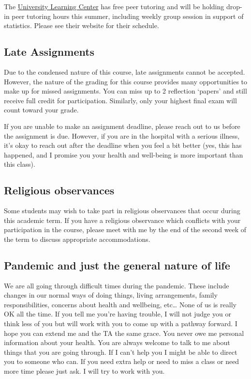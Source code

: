 \documentclass[
]{book}
\begin{document}
The \href{https://www.nyu.edu/students/academic-services/undergraduate-advisement/academic-resource-center/tutoring-and-learning.html}{University Learning Center} has free peer tutoring and will be holding drop-in peer tutoring hours this summer, including weekly group session in support of statistics. Please see their website for their schedule.

\hypertarget{late-assignments}{%
\subsection{Late Assignments}\label{late-assignments}}

Due to the condensed nature of this course, late assignments cannot be accepted. However, the nature of the grading for this course provides many opportunities to make up for missed assignments. You can miss up to 2 reflection `papers' and still receive full credit for participation. Similarly, only your highest final exam will count toward your grade.

If you are unable to make an assignment deadline, please reach out to us before the assignment is due. However, if you are in the hospital with a serious illness, it's okay to reach out after the deadline when you feel a bit better (yes, this has happened, and I promise you your health and well-being is more important than this class).

\hypertarget{religious-observances}{%
\subsection{Religious observances}\label{religious-observances}}

Some students may wish to take part in religious observances that occur during this academic term. If you have a religious observance which conflicts with your participation in the course, please meet with me by the end of the second week of the term to discuss appropriate accommodations.

\hypertarget{pandemic-and-just-the-general-nature-of-life}{%
\subsection{Pandemic and just the general nature of life}\label{pandemic-and-just-the-general-nature-of-life}}

We are all going through difficult times during the pandemic. These include changes in our normal ways of doing things, living arrangements, family responsibilities, concerns about health and wellbeing, etc\ldots{} None of us is really OK all the time. If you tell me you're having trouble, I will not judge you or think less of you but will work with you to come up with a pathway forward. I hope you can extend me and the TA the same grace. You never owe me personal information about your health. You are always welcome to talk to me about things that you are going through. If I can't help you I might be able to direct you to someone who can. If you need extra help or need to miss a class or need more time please just ask. I will try to work with you.

  
\end{document}
